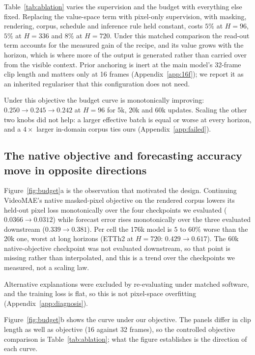 

Table~\ref{tab:ablation} varies the supervision and the budget with everything else fixed. Replacing
the value-space term with pixel-only supervision, with masking, rendering, corpus, schedule and
inference rule held constant, costs $5\%$ at $H{=}96$, $5\%$ at $H{=}336$ and $8\%$ at $H{=}720$. Under this
matched comparison the read-out term accounts for the measured gain of the recipe, and its value
grows with the horizon, which is where more of the output is generated rather than carried over from
the visible context. Prior anchoring \citep{l2sp} is inert at the main model's 32-frame clip length
and matters only at 16 frames (Appendix~\ref{app:16f}); we report it as an inherited regulariser
that this configuration does not need.

Under this objective the budget curve is monotonically improving: $0.250 \to 0.245 \to 0.242$ at
$H{=}96$ for 5k, 20k and 60k updates. Scaling the other two knobs did not help: a larger effective
batch is equal or worse at every horizon, and a $4\times$ larger in-domain corpus ties ours
(Appendix~\ref{app:failed}).

\subsection{The native objective and forecasting accuracy move in opposite directions}
\label{sec:diagnosis}



Figure~\ref{fig:budget}a is the observation that motivated the design. Continuing VideoMAE's native
masked-pixel objective on the rendered corpus lowers its held-out pixel loss monotonically over the
four checkpoints we evaluated ($0.0366 \to 0.0312$) while forecast error rises monotonically over the
three evaluated downstream ($0.339 \to 0.381$). Per cell the 176k model is $5$ to $60\%$ worse than the
20k one, worst at long horizons (ETTh2 at $H{=}720$: $0.429 \to 0.617$). The 60k native-objective
checkpoint was not evaluated downstream, so that point is missing rather than interpolated, and this
is a trend over the checkpoints we measured, not a scaling law.

Alternative explanations were excluded by re-evaluating under matched software, and the training loss
is flat, so this is not pixel-space overfitting (Appendix~\ref{app:diagnosis}).

Figure~\ref{fig:budget}b shows the curve under our objective. The panels differ in clip length as
well as objective (16 against 32 frames), so the controlled objective comparison is
Table~\ref{tab:ablation}; what the figure establishes is the direction of each curve.

